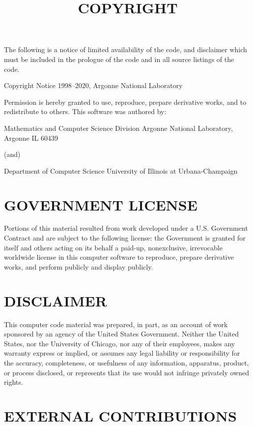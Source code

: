 \documentclass[a4paper, 12pt]{article}
\begin{document}
\title{COPYRIGHT}
\date{}

\maketitle

The following is a notice of limited availability of the code, and disclaimer
which must be included in the prologue of the code and in all source listings
of the code.

Copyright Notice
1998--2020, Argonne National Laboratory

Permission is hereby granted to use, reproduce, prepare derivative works, and
to redistribute to others.  This software was authored by:

Mathematics and Computer Science Division
Argonne National Laboratory, Argonne IL 60439

(and)

Department of Computer Science
University of Illinois at Urbana-Champaign

\section{GOVERNMENT LICENSE}

Portions of this material resulted from work developed under a U.S.
Government Contract and are subject to the following license: the Government
is granted for itself and others acting on its behalf a paid-up, nonexclusive,
irrevocable worldwide license in this computer software to reproduce, prepare
derivative works, and perform publicly and display publicly.

\section{DISCLAIMER}

This computer code material was prepared, in part, as an account of work
sponsored by an agency of the United States Government.  Neither the United
States, nor the University of Chicago, nor any of their employees, makes any
warranty express or implied, or assumes any legal liability or responsibility
for the accuracy, completeness, or usefulness of any information, apparatus,
product, or process disclosed, or represents that its use would not infringe
privately owned rights.

\section{EXTERNAL CONTRIBUTIONS}
\end{document}

